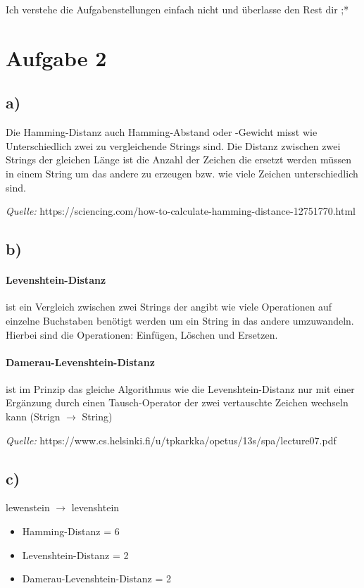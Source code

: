 \documentclass[11pt,a4paper,parskip=half ]{scrartcl}
\begin{document}
		Ich verstehe die Aufgabenstellungen 	 einfach nicht und überlasse den Rest dir ;*
		
	\section*{Aufgabe 2}
		\subsection*{a)}Die Hamming-Distanz auch Hamming-Abstand oder -Gewicht misst wie Unterschiedlich zwei zu vergleichende Strings sind. Die Distanz zwischen zwei Strings der gleichen Länge ist die Anzahl der Zeichen die ersetzt werden müssen in einem String um das andere zu erzeugen bzw. wie viele Zeichen unterschiedlich sind.
		
		\textit{Quelle:} https://sciencing.com/how-to-calculate-hamming-distance-12751770.html
		
		\subsection*{b)}
		\paragraph{Levenshtein-Distanz} ist ein Vergleich zwischen zwei Strings der angibt wie viele Operationen auf einzelne Buchstaben benötigt werden um ein String in das andere umzuwandeln. Hierbei sind die Operationen: Einfügen, Löschen und Ersetzen.
		
		\paragraph{Damerau-Levenshtein-Distanz} ist im Prinzip das gleiche Algorithmus wie die Levenshtein-Distanz nur mit einer Ergänzung durch einen Tausch-Operator der zwei vertauschte Zeichen wechseln kann (Strign $\rightarrow$ String)
		
		\textit{Quelle:} https://www.cs.helsinki.fi/u/tpkarkka/opetus/13s/spa/lecture07.pdf
		
		\subsection*{c)}
		lewenstein $\rightarrow$ levenshtein
		\begin{itemize}
			\item Hamming-Distanz = 6
			\item Levenshtein-Distanz = 2
			\item Damerau-Levenshtein-Distanz = 2
		\end{itemize}
		
\end{document}
